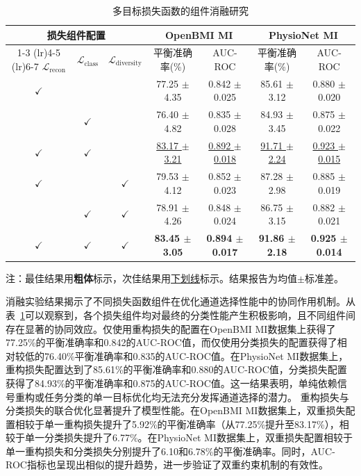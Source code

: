\begin{table}[htbp]
\centering
\caption{多目标损失函数的组件消融研究}
\label{tab:C4-6}
\begin{tabular}{ccccccc}
\toprule
\multicolumn{3}{c}{损失组件配置} & \multicolumn{2}{c}{OpenBMI MI} & \multicolumn{2}{c}{PhysioNet MI} \\ 
\cmidrule(lr){1-3} \cmidrule(lr){4-5} \cmidrule(lr){6-7}
$\mathcal{L}_{\text{recon}}$ & $\mathcal{L}_{\text{class}}$ & $\mathcal{L}_{\text{diversity}}$ & 平衡准确率(\%) & AUC-ROC & 平衡准确率(\%) & AUC-ROC \\
\midrule
$\checkmark$ &  &  & 77.25 $\pm$ 4.35 & 0.842 $\pm$ 0.025 & 85.61 $\pm$ 3.12 & 0.880 $\pm$ 0.020 \\
 & $\checkmark$ &  & 76.40 $\pm$ 4.82 & 0.835 $\pm$ 0.028 & 84.93 $\pm$ 3.45 & 0.875 $\pm$ 0.022 \\
$\checkmark$ & $\checkmark$ &  & \uline{83.17 $\pm$ 3.21} & \uline{0.892 $\pm$ 0.018} & \uline{91.71 $\pm$ 2.24} & \uline{0.923 $\pm$ 0.015} \\
$\checkmark$ &  & $\checkmark$ & 79.53 $\pm$ 4.12 & 0.852 $\pm$ 0.023 & 87.28 $\pm$ 2.98 & 0.885 $\pm$ 0.019 \\
 & $\checkmark$ & $\checkmark$ & 78.91 $\pm$ 4.26 & 0.848 $\pm$ 0.024 & 86.75 $\pm$ 3.15 & 0.882 $\pm$ 0.021 \\
\midrule
$\checkmark$ & $\checkmark$ & $\checkmark$ & \textbf{83.45 $\pm$ 3.05} & \textbf{0.894 $\pm$ 0.017} & \textbf{91.86 $\pm$ 2.18} & \textbf{0.925 $\pm$ 0.014} \\
\bottomrule
\end{tabular}%
\begin{tablenotes}
\footnotesize
\item[]\centering 注：最佳结果用\textbf{粗体}标示，次佳结果用\underline{下划线}标示。结果报告为均值$\pm$标准差。
\end{tablenotes}
\end{table}

消融实验结果揭示了不同损失函数组件在优化通道选择性能中的协同作用机制。从表~\ref{tab:C4-6}可以观察到，各个损失组件均对最终的分类性能产生积极影响，且不同组件间存在显著的协同效应。仅使用重构损失的配置在OpenBMI MI数据集上获得了77.25\%的平衡准确率和0.842的AUC-ROC值，而仅使用分类损失的配置获得了相对较低的76.40\%平衡准确率和0.835的AUC-ROC值。在PhysioNet MI数据集上，重构损失配置达到了85.61\%的平衡准确率和0.880的AUC-ROC值，分类损失配置获得了84.93\%的平衡准确率和0.875的AUC-ROC值。这一结果表明，单纯依赖信号重构或任务分类的单一目标优化均无法充分发挥通道选择的潜力。
重构损失与分类损失的联合优化显著提升了模型性能。在OpenBMI MI数据集上，双重损失配置相较于单一重构损失提升了5.92\%的平衡准确率（从77.25\%提升至83.17\%），相较于单一分类损失提升了6.77\%。在PhysioNet MI数据集上，双重损失配置相较于单一重构损失和分类损失分别提升了6.10和6.78\%的平衡准确率。同时，AUC-ROC指标也呈现出相似的提升趋势，进一步验证了双重约束机制的有效性。

